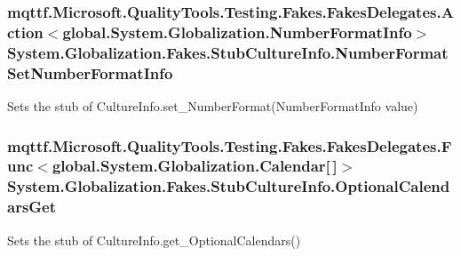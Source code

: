 \hypertarget{class_system_1_1_globalization_1_1_fakes_1_1_stub_culture_info_a7501dbaae51d2c49262a519b05a0bf6a}{
\subsubsection[{Number\-Format\-Set\-Number\-Format\-Info}]{\setlength{\rightskip}{0pt plus 5cm}mqttf.\-Microsoft.\-Quality\-Tools.\-Testing.\-Fakes.\-Fakes\-Delegates.\-Action$<$global.\-System.\-Globalization.\-Number\-Format\-Info$>$ System.\-Globalization.\-Fakes.\-Stub\-Culture\-Info.\-Number\-Format\-Set\-Number\-Format\-Info}}\label{class_system_1_1_globalization_1_1_fakes_1_1_stub_culture_info_a7501dbaae51d2c49262a519b05a0bf6a}


Sets the stub of Culture\-Info.\-set\-\_\-\-Number\-Format(\-Number\-Format\-Info value)

\hypertarget{class_system_1_1_globalization_1_1_fakes_1_1_stub_culture_info_a157f4e7d7b98307b4d78da0fb6e00830}{
\subsubsection[{Optional\-Calendars\-Get}]{\setlength{\rightskip}{0pt plus 5cm}mqttf.\-Microsoft.\-Quality\-Tools.\-Testing.\-Fakes.\-Fakes\-Delegates.\-Func$<$global.\-System.\-Globalization.\-Calendar\mbox{[}$\,$\mbox{]}$>$ System.\-Globalization.\-Fakes.\-Stub\-Culture\-Info.\-Optional\-Calendars\-Get}}\label{class_system_1_1_globalization_1_1_fakes_1_1_stub_culture_info_a157f4e7d7b98307b4d78da0fb6e00830}


Sets the stub of Culture\-Info.\-get\-\_\-\-Optional\-Calendars()

